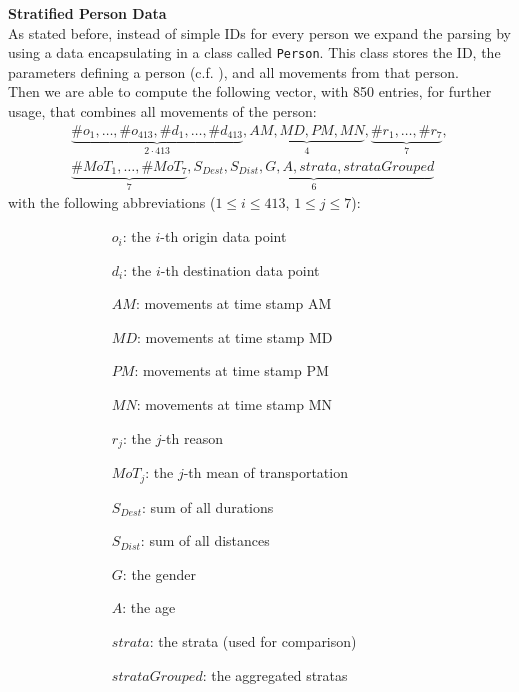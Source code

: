 	\textbf{Stratified Person Data}\label{subsubsec: person vector data}\\
	As stated before, instead of simple IDs for every person we expand the parsing by using a data encapsulating in a class called \texttt{Person}. This class stores the ID, the parameters defining a person (c.f. ), and all movements from that person.\\
	Then we are able to compute the following vector, with 850 entries, for further usage, that combines all movements of the person:
	\begin{align*}
	\underbrace{\#o_1, \dots, \#o_{413}, \#d_1, \dots, \#d_{413}}_{2\cdot 413} ,
	\underbrace{\mathit{AM}, \mathit{MD}, \mathit{PM}, \mathit{MN}}_{4}, 
	\underbrace{\#r_1, \dots, \#r_7}_{7}, \\
	\underbrace{\#\mathit{MoT}_1, \dots, \#\mathit{MoT}_7}_{7}, \underbrace{\mathit{S_{Dest}}, \mathit{S_{Dist}}, \mathit{G}, \mathit{A} ,\mathit{strata}, \mathit{strataGrouped}}_{6}
	\end{align*}
	with the following abbreviations ($1 \le i \le 413$, $1 \le j \le 7$):
	\begin{figure}[H]
		\centering
		\hspace*{-.3cm}
		\begin{subfigure}{0.50\textwidth}
		\begin{itemize}
			\setlength{\itemindent}{.4cm}
			\item[$o_i$:]  the $i$-th origin data point
			\item[$d_i$:]  the $i$-th destination data point
			\item[$\mathit{AM}$:] movements at time stamp AM
			\item[$\mathit{MD}$:] movements at time stamp MD
			\item[$\mathit{PM}$:] movements at time stamp PM
			\item[$\mathit{MN}$:] movements at time stamp MN
			\item[$r_j$:] the $j$-th reason
		\end{itemize}
	\end{subfigure}\hspace*{1cm}
	\begin{subfigure}{0.48\textwidth}
	\begin{itemize}
			\item[$\mathit{MoT}_j$:] the $j$-th mean of transportation
			\item[$\mathit{S_{Dest}}$:] sum of all durations
			\item[$\mathit{S_{Dist}}$:] sum of all distances
			\item[$\mathit{G}$:] the gender
			\item[$\mathit{A}$:] the age
			\item[$strata$:] the strata (used for comparison)
			\item[$strataGrouped$:] the aggregated stratas
		\end{itemize}
	\end{subfigure}
	\end{figure}
